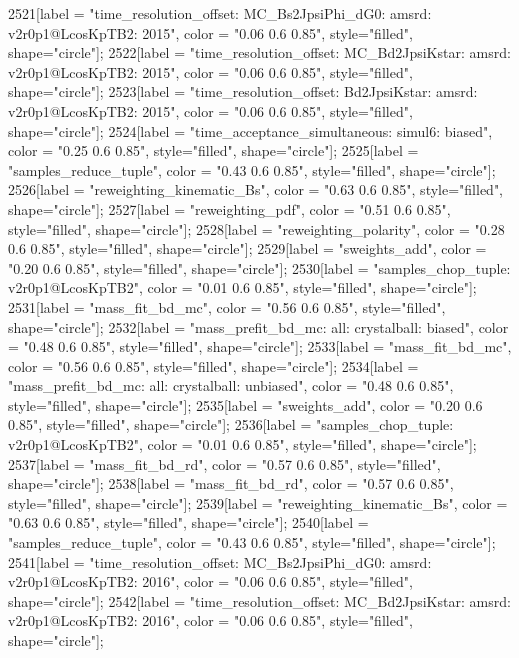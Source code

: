 {	2521[label = "time_resolution_offset\nmode: MC_Bs2JpsiPhi_dG0\ntimeres: amsrd\nversion: v2r0p1@LcosKpTB2\nyear: 2015", color = "0.06 0.6 0.85", style="filled", shape="circle"];
	2522[label = "time_resolution_offset\nmode: MC_Bd2JpsiKstar\ntimeres: amsrd\nversion: v2r0p1@LcosKpTB2\nyear: 2015", color = "0.06 0.6 0.85", style="filled", shape="circle"];
	2523[label = "time_resolution_offset\nmode: Bd2JpsiKstar\ntimeres: amsrd\nversion: v2r0p1@LcosKpTB2\nyear: 2015", color = "0.06 0.6 0.85", style="filled", shape="circle"];
	2524[label = "time_acceptance_simultaneous\ntimeacc: simul6\ntrigger: biased", color = "0.25 0.6 0.85", style="filled", shape="circle"];
	2525[label = "samples_reduce_tuple", color = "0.43 0.6 0.85", style="filled", shape="circle"];
	2526[label = "reweighting_kinematic_Bs", color = "0.63 0.6 0.85", style="filled", shape="circle"];
	2527[label = "reweighting_pdf", color = "0.51 0.6 0.85", style="filled", shape="circle"];
	2528[label = "reweighting_polarity", color = "0.28 0.6 0.85", style="filled", shape="circle"];
	2529[label = "sweights_add", color = "0.20 0.6 0.85", style="filled", shape="circle"];
	2530[label = "samples_chop_tuple\nversion: v2r0p1@LcosKpTB2", color = "0.01 0.6 0.85", style="filled", shape="circle"];
	2531[label = "mass_fit_bd_mc", color = "0.56 0.6 0.85", style="filled", shape="circle"];
	2532[label = "mass_prefit_bd_mc\nmassbin: all\nmassmodel: crystalball\ntrigger: biased", color = "0.48 0.6 0.85", style="filled", shape="circle"];
	2533[label = "mass_fit_bd_mc", color = "0.56 0.6 0.85", style="filled", shape="circle"];
	2534[label = "mass_prefit_bd_mc\nmassbin: all\nmassmodel: crystalball\ntrigger: unbiased", color = "0.48 0.6 0.85", style="filled", shape="circle"];
	2535[label = "sweights_add", color = "0.20 0.6 0.85", style="filled", shape="circle"];
	2536[label = "samples_chop_tuple\nversion: v2r0p1@LcosKpTB2", color = "0.01 0.6 0.85", style="filled", shape="circle"];
	2537[label = "mass_fit_bd_rd", color = "0.57 0.6 0.85", style="filled", shape="circle"];
	2538[label = "mass_fit_bd_rd", color = "0.57 0.6 0.85", style="filled", shape="circle"];
	2539[label = "reweighting_kinematic_Bs", color = "0.63 0.6 0.85", style="filled", shape="circle"];
	2540[label = "samples_reduce_tuple", color = "0.43 0.6 0.85", style="filled", shape="circle"];
	2541[label = "time_resolution_offset\nmode: MC_Bs2JpsiPhi_dG0\ntimeres: amsrd\nversion: v2r0p1@LcosKpTB2\nyear: 2016", color = "0.06 0.6 0.85", style="filled", shape="circle"];
	2542[label = "time_resolution_offset\nmode: MC_Bd2JpsiKstar\ntimeres: amsrd\nversion: v2r0p1@LcosKpTB2\nyear: 2016", color = "0.06 0.6 0.85", style="filled", shape="circle"];
}
